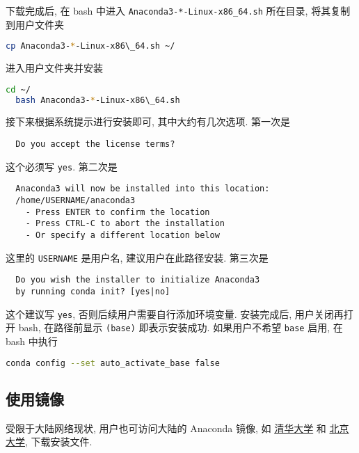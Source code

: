 \documentclass[fontset=founder]{ctexrep}
\begin{document}
下载完成后,
在 \textsf{bash} 中进入 \texttt{Anaconda3-*-Linux-x86\_64.sh} 所在目录,
将其复制到用户文件夹
\begin{lstlisting}[language=bash]
  cp Anaconda3-*-Linux-x86\_64.sh ~/
\end{lstlisting}
进入用户文件夹并安装
\begin{lstlisting}[language=bash]
  cd ~/
  bash Anaconda3-*-Linux-x86\_64.sh
\end{lstlisting}
接下来根据系统提示进行安装即可,
其中大约有几次选项.
第一次是
\begin{lstlisting}
  Do you accept the license terms?
\end{lstlisting}
这个必须写 \texttt{yes}.
第二次是
\begin{lstlisting}
  Anaconda3 will now be installed into this location:
  /home/USERNAME/anaconda3
    - Press ENTER to confirm the location
    - Press CTRL-C to abort the installation
    - Or specify a different location below
\end{lstlisting}
这里的 \texttt{USERNAME} 是用户名,
建议用户在此路径安装.
第三次是
\begin{lstlisting}
  Do you wish the installer to initialize Anaconda3
  by running conda init? [yes|no]
\end{lstlisting}
这个建议写 \texttt{yes},
否则后续用户需要自行添加环境变量.
安装完成后,
用户关闭再打开 \textsf{bash},
在路径前显示 \texttt{(base)} 即表示安装成功.
如果用户不希望 \texttt{base} 启用,
在 \textsf{bash} 中执行
\begin{lstlisting}[language=bash]
  conda config --set auto_activate_base false
\end{lstlisting}

\subsection{使用镜像}

受限于大陆网络现状,
用户也可访问大陆的 Anaconda 镜像,
如%
\href{https://mirrors.tuna.tsinghua.edu.cn/anaconda/archive/}{清华大学}%
和%
\href{https://mirrors.pku.edu.cn/anaconda/archive/}{北京大学},
下载安装文件.
\end{document}

